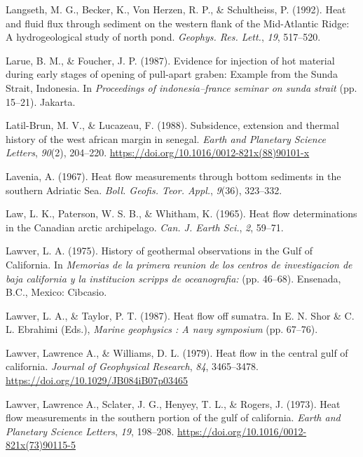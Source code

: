 \documentclass[draft,linenumbers]{agujournal2018}
\begin{document}
\leavevmode{}%
Langseth, M. G., Becker, K., Von Herzen, R. P., \& Schultheiss, P.
(1992). Heat and fluid flux through sediment on the western flank of the
{Mid-Atlantic Ridge}: A hydrogeological study of north pond.
\emph{Geophys. Res. Lett.}, \emph{19}, 517--520.

\leavevmode{}%
Larue, B. M., \& Foucher, J. P. (1987). Evidence for injection of hot
material during early stages of opening of pull-apart graben: Example
from the {Sunda Strait, Indonesia}. In \emph{Proceedings of
indonesia--france seminar on sunda strait} (pp. 15--21). Jakarta.

\leavevmode{}%
Latil-Brun, M. V., \& Lucazeau, F. (1988). Subsidence, extension and
thermal history of the west african margin in senegal. \emph{Earth and
Planetary Science Letters}, \emph{90}(2), 204--220.
\url{https://doi.org/10.1016/0012-821x(88)90101-x}

\leavevmode{}%
Lavenia, A. (1967). Heat flow measurements through bottom sediments in
the southern {Adriatic Sea}. \emph{Boll. Geofis. Teor. Appl.},
\emph{9}(36), 323--332.

\leavevmode{}%
Law, L. K., Paterson, W. S. B., \& Whitham, K. (1965). Heat flow
determinations in the {Canadian} arctic archipelago. \emph{Can. J. Earth
Sci.}, \emph{2}, 59--71.

\leavevmode{}%
Lawver, L. A. (1975). History of geothermal observations in the {Gulf of
California}. In \emph{Memorias de la primera reunion de los centros de
investigacion de baja california y la institucion scripps de
oceanografia:} (pp. 46--68). Ensenada, B.C., Mexico: Cibcasio.

\leavevmode{}%
Lawver, L. A., \& Taylor, P. T. (1987). Heat flow off sumatra. In E. N.
Shor \& C. L. Ebrahimi (Eds.), \emph{Marine geophysics : A navy
symposium} (pp. 67--76).

\leavevmode{}%
Lawver, Lawrence A., \& Williams, D. L. (1979). Heat flow in the central
gulf of california. \emph{Journal of Geophysical Research}, \emph{84},
3465--3478. \url{https://doi.org/10.1029/JB084iB07p03465}

\leavevmode{}%
Lawver, Lawrence A., Sclater, J. G., Henyey, T. L., \& Rogers, J.
(1973). Heat flow measurements in the southern portion of the gulf of
california. \emph{Earth and Planetary Science Letters}, \emph{19},
198--208. \url{https://doi.org/10.1016/0012-821x(73)90115-5}
\end{document}
